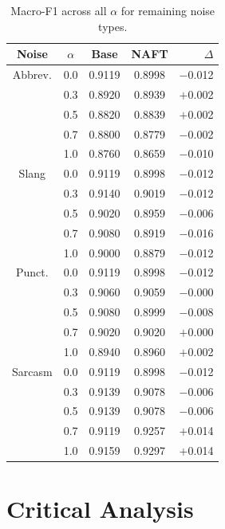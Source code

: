 \documentclass[sigconf]{acmart}
\begin{document}
\begin{table}[h]
  \centering\footnotesize\setlength{\tabcolsep}{3pt}
  \caption{Macro-F1 across all $\alpha$ for remaining noise types.}
  \label{tab:results2}
  \begin{tabular}{ccccr}
    \toprule
    \textbf{Noise} & $\alpha$ & \textbf{Base} & \textbf{NAFT} & $\Delta$ \\
    \midrule
    Abbrev. & 0.0 & 0.9119 & 0.8998 & $-$0.012 \\
            & 0.3 & 0.8920 & 0.8939 & $+$0.002 \\
            & 0.5 & 0.8820 & 0.8839 & $+$0.002 \\
            & 0.7 & 0.8800 & 0.8779 & $-$0.002 \\
            & 1.0 & 0.8760 & 0.8659 & $-$0.010 \\
    \addlinespace
    Slang   & 0.0 & 0.9119 & 0.8998 & $-$0.012 \\
            & 0.3 & 0.9140 & 0.9019 & $-$0.012 \\
            & 0.5 & 0.9020 & 0.8959 & $-$0.006 \\
            & 0.7 & 0.9080 & 0.8919 & $-$0.016 \\
            & 1.0 & 0.9000 & 0.8879 & $-$0.012 \\
    \addlinespace
    Punct.  & 0.0 & 0.9119 & 0.8998 & $-$0.012 \\
            & 0.3 & 0.9060 & 0.9059 & $-$0.000 \\
            & 0.5 & 0.9080 & 0.8999 & $-$0.008 \\
            & 0.7 & 0.9020 & 0.9020 & $+$0.000 \\
            & 1.0 & 0.8940 & 0.8960 & $+$0.002 \\
    \addlinespace
    Sarcasm & 0.0 & 0.9119 & 0.8998 & $-$0.012 \\
            & 0.3 & 0.9139 & 0.9078 & $-$0.006 \\
            & 0.5 & 0.9139 & 0.9078 & $-$0.006 \\
            & 0.7 & 0.9119 & 0.9257 & $+$0.014 \\
            & 1.0 & 0.9159 & 0.9297 & $+$0.014 \\
    \bottomrule
  \end{tabular}
\end{table}

\section{Critical Analysis}
\label{sec:analysis}
\end{document}
